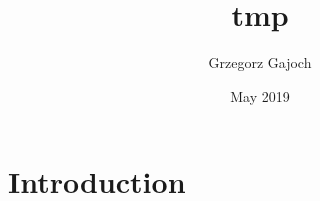 \documentclass{article}
\title{tmp}
\author{Grzegorz Gajoch}
\date{May 2019}
\begin{document}
\maketitle

\section{Introduction}
\end{document}
